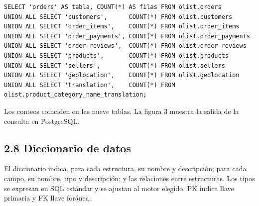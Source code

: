 \documentclass[a4paper,stu,12pt,donotrepeattitle,floatsintext]{apa7}
\begin{document}
\begin{lstlisting}
SELECT 'orders' AS tabla, COUNT(*) AS filas FROM olist.orders
UNION ALL SELECT 'customers',      COUNT(*) FROM olist.customers
UNION ALL SELECT 'order_items',    COUNT(*) FROM olist.order_items
UNION ALL SELECT 'order_payments', COUNT(*) FROM olist.order_payments
UNION ALL SELECT 'order_reviews',  COUNT(*) FROM olist.order_reviews
UNION ALL SELECT 'products',       COUNT(*) FROM olist.products
UNION ALL SELECT 'sellers',        COUNT(*) FROM olist.sellers
UNION ALL SELECT 'geolocation',    COUNT(*) FROM olist.geolocation
UNION ALL SELECT 'translation',    COUNT(*) FROM olist.product_category_name_translation;
\end{lstlisting}
Los conteos coinciden en las nueve tablas. La figura 3 muestra la salida de la consulta en PostgreSQL.

\subsection{2.8 Diccionario de datos}
El diccionario indica, para cada estructura, su nombre y descripción; para cada campo, su nombre, tipo y descripción; y las relaciones entre estructuras. Los tipos se expresan en SQL estándar y se ajustan al motor elegido. PK indica llave primaria y FK llave foránea.

\end{document}
